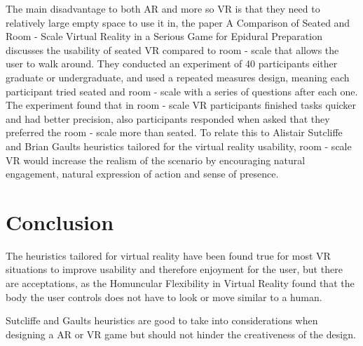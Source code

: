 \documentclass{scrartcl}
\begin{document}
The main disadvantage to both AR and more so VR is that they need to relatively large empty space to use it in, the paper A Comparison of Seated and Room - Scale Virtual Reality in a Serious Game for Epidural Preparation\cite{shewaga2017comparison} discusses the usability of seated VR compared to room - scale that allows the user to walk around. They conducted an experiment of 40 participants either graduate or undergraduate, and used a repeated measures design, meaning each participant tried seated and room - scale with a series of questions after each one. The experiment found that in room - scale VR participants finished tasks quicker and had better precision, also participants responded when asked that they preferred the room - scale more than seated. To relate this to Alistair Sutcliffe and Brian Gaults heuristics tailored for the virtual reality usability, room - scale VR would increase the realism of the scenario by encouraging natural engagement, natural expression of action and sense of presence.

\section*{Conclusion}

The heuristics tailored for virtual reality have been found true for most VR situations to improve usability and therefore enjoyment for the user, but there are acceptations, as the Homuncular Flexibility in Virtual Reality found that the body the user controls does not have to look or move similar to a human.

Sutcliffe and Gaults heuristics are good to take into considerations when designing a AR or VR game but should not hinder the creativeness of the design.



\end{document}
